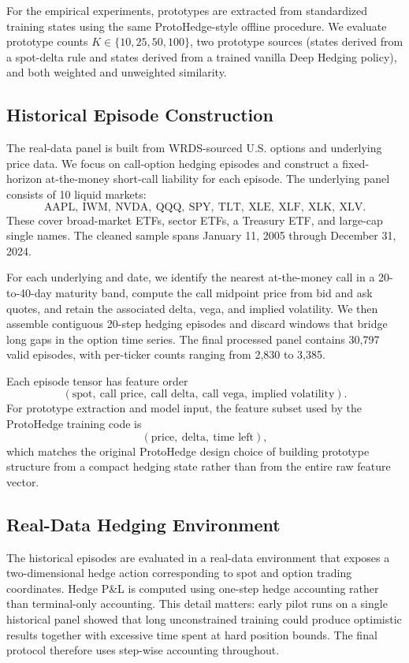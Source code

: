 \documentclass[11pt]{article}
\begin{document}
For the empirical experiments, prototypes are extracted from standardized training states using the same ProtoHedge-style offline procedure. We evaluate prototype counts $K \in \{10,25,50,100\}$, two prototype sources (states derived from a spot-delta rule and states derived from a trained vanilla Deep Hedging policy), and both weighted and unweighted similarity.

\subsection{Historical Episode Construction}
The real-data panel is built from WRDS-sourced U.S. options and underlying price data. We focus on call-option hedging episodes and construct a fixed-horizon at-the-money short-call liability for each episode. The underlying panel consists of 10 liquid markets:
\[
\text{AAPL},\ \text{IWM},\ \text{NVDA},\ \text{QQQ},\ \text{SPY},\ \text{TLT},\ \text{XLE},\ \text{XLF},\ \text{XLK},\ \text{XLV}.
\]
These cover broad-market ETFs, sector ETFs, a Treasury ETF, and large-cap single names. The cleaned sample spans January 11, 2005 through December 31, 2024.

For each underlying and date, we identify the nearest at-the-money call in a 20-to-40-day maturity band, compute the call midpoint price from bid and ask quotes, and retain the associated delta, vega, and implied volatility. We then assemble contiguous 20-step hedging episodes and discard windows that bridge long gaps in the option time series. The final processed panel contains 30,797 valid episodes, with per-ticker counts ranging from 2,830 to 3,385.

Each episode tensor has feature order
\[
(\text{spot},\ \text{call price},\ \text{call delta},\ \text{call vega},\ \text{implied volatility}).
\]
For prototype extraction and model input, the feature subset used by the ProtoHedge training code is
\[
(\text{price},\ \text{delta},\ \text{time left}),
\]
which matches the original ProtoHedge design choice of building prototype structure from a compact hedging state rather than from the entire raw feature vector.

\subsection{Real-Data Hedging Environment}
The historical episodes are evaluated in a real-data environment that exposes a two-dimensional hedge action corresponding to spot and option trading coordinates. Hedge P\&L is computed using one-step hedge accounting rather than terminal-only accounting. This detail matters: early pilot runs on a single historical panel showed that long unconstrained training could produce optimistic results together with excessive time spent at hard position bounds. The final protocol therefore uses step-wise accounting throughout.
\end{document}
